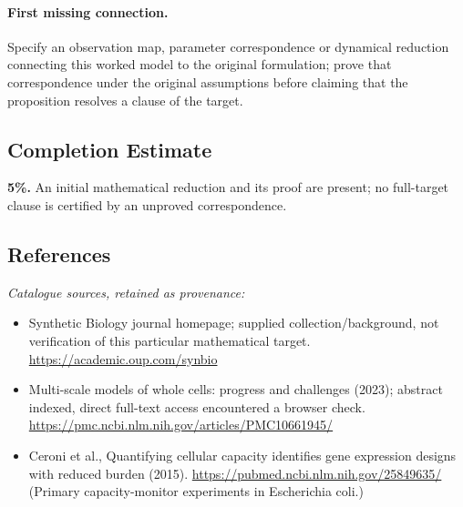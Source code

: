 \documentclass[11pt]{article}
\begin{document}
\paragraph{First missing connection.} Specify an observation map, parameter correspondence or dynamical reduction connecting this worked model to the original formulation; prove that correspondence under the original assumptions before claiming that the proposition resolves a clause of the target.
\subsection{Completion Estimate}
\textbf{5\%.} An initial mathematical reduction and its proof are present; no full-target clause is certified by an unproved correspondence.
\subsection{References}
\noindent\emph{Catalogue sources, retained as provenance:}
\begin{itemize}
\item Synthetic Biology journal homepage; supplied collection/background, not verification of this particular mathematical target. \url{https://academic.oup.com/synbio}
\item Multi-scale models of whole cells: progress and challenges (2023); abstract indexed, direct full-text access encountered a browser check. \url{https://pmc.ncbi.nlm.nih.gov/articles/PMC10661945/}
\item Ceroni et al., Quantifying cellular capacity identifies gene expression designs with reduced burden (2015). \url{https://pubmed.ncbi.nlm.nih.gov/25849635/} (Primary capacity-monitor experiments in Escherichia coli.)
\end{itemize}
\clearpage


\appendix
\end{document}
